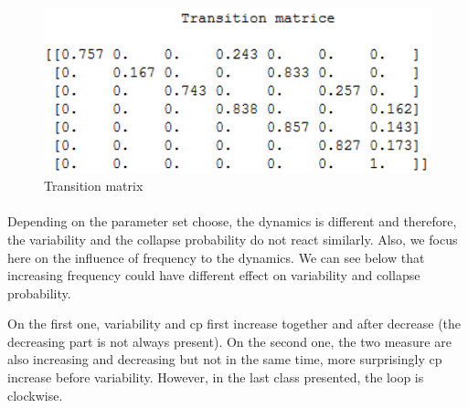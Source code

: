 \documentclass{article}
\begin{document}

\begin{figure}[h!]
\begin{center}
\includegraphics[width=12cm]{results/matrice_transition.png}
\end{center}
\caption{\label{fig:temp}Transition matrix}
\end{figure}





\paragraph{}
Depending on the parameter set choose, the dynamics is different and therefore, the variability and the collapse probability do not react similarly. Also, we focus here on the influence of frequency to the dynamics. We can see below that increasing frequency could have different effect on variability and collapse probability.

On the first one, variability and cp first increase together and after decrease (the decreasing part is not always present). On the second one, the two measure are also increasing and decreasing but not in the same time, more surprisingly cp increase before variability. However, in the last class presented, the loop is clockwise.
\end{document}
